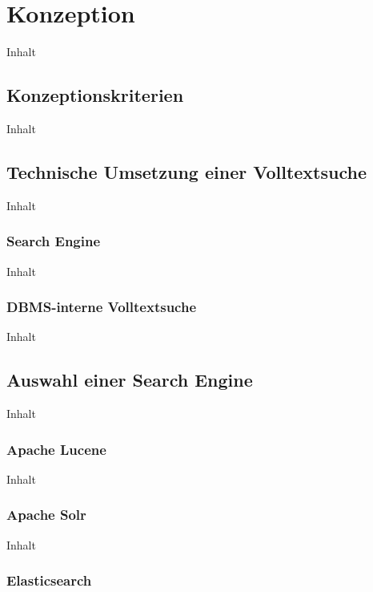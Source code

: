 \chapter{Konzeption\label{chap4:Viertes-Kapitel}}

Inhalt

\section{Konzeptionskriterien\label{sec4.1:Unterpunkt-1}}

Inhalt

\section{Technische Umsetzung einer Volltextsuche\label{sec4.2:Unterpunkt-2}}

Inhalt

\subsection{Search Engine\label{subsec4.2.1:Unterunterpunkt-1}}

Inhalt

\subsection{DBMS-interne Volltextsuche\label{subsec4.2.2:Unterunterpunkt-2}}

Inhalt

\section{Auswahl einer Search Engine\label{sec4.3:Unterpunkt-3}}

Inhalt

\subsection{Apache Lucene\label{subsec4.3.1:Unterunterpunkt-1}}

Inhalt

\subsection{Apache Solr\label{subsec4.3.2:Unterunterpunkt-2}}

Inhalt

\subsection{Elasticsearch\label{subsec4.3.3:Unterunterpunkt-3}}

